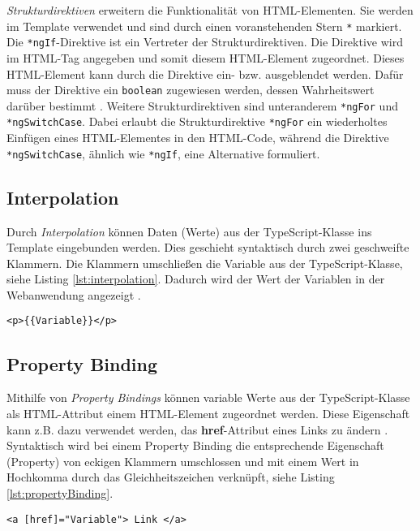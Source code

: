 \textit{Strukturdirektiven} erweitern die Funktionalität von HTML-Elementen. Sie werden im Template verwendet und sind durch einen voranstehenden Stern \texttt{*} markiert. Die \texttt{*ngIf}-Direktive ist ein Vertreter der Strukturdirektiven. Die Direktive wird im HTML-Tag angegeben und somit diesem HTML-Element zugeordnet. 
Dieses HTML-Element kann durch die Direktive ein- bzw. ausgeblendet werden. Dafür muss der Direktive ein \texttt{boolean} zugewiesen werden, dessen Wahrheitswert darüber bestimmt \cite{Book2020}\cite{NgIf2021}.
Weitere Strukturdirektiven sind unteranderem \texttt{*ngFor} und \texttt{*ngSwitchCase}. Dabei erlaubt die Strukturdirektive \texttt{*ngFor} ein wiederholtes Einfügen eines HTML-Elementes in den HTML-Code, während die Direktive \texttt{*ngSwitchCase}, ähnlich wie \texttt{*ngIf}, eine Alternative formuliert. 

\subsection{Interpolation}

Durch \textit{Interpolation} können Daten (Werte) aus der TypeScript-Klasse ins Template eingebunden werden. Dies geschieht syntaktisch durch zwei geschweifte Klammern. Die Klammern umschließen die Variable aus der TypeScript-Klasse, siehe Listing \ref{lst:interpolation}. Dadurch wird der Wert der Variablen in der Webanwendung angezeigt \cite{Book2020}\cite{interpolation2021}. 
\begin{lstlisting}[caption=Interpolation im Template, label=lst:interpolation]
    <p>{{Variable}}</p>
\end{lstlisting}

\subsection{Property Binding}\label{subsec:propertyBinding}
Mithilfe von \textit{Property Bindings} können variable Werte aus der TypeScript-Klasse als HTML-Attribut einem HTML-Element zugeordnet werden. Diese Eigenschaft kann z.B. dazu verwendet werden, das \textbf{href}-Attribut eines Links zu ändern \cite{Book2020}\cite{propertyBinding2021}. 
Syntaktisch wird bei einem Property Binding die entsprechende Eigenschaft (Property) von eckigen Klammern umschlossen und mit einem Wert in Hochkomma durch das Gleichheitszeichen verknüpft, siehe Listing \ref{lst:propertyBinding}.
\begin{lstlisting}[caption=Property Binding, label=lst:propertyBinding]
    <a [href]="Variable"> Link </a>
\end{lstlisting}
